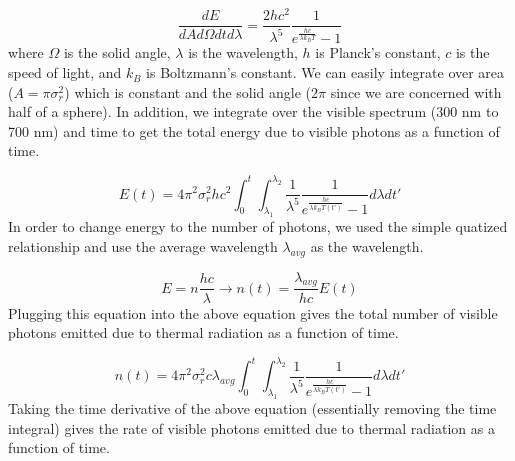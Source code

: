 \documentclass[12pt]{article}
\begin{document}
\begin{equation}
\frac{dE}{dA d \Omega dt d \lambda} = \frac{2 h c^2}{\lambda^{5}} \frac{1}{e^{\frac{hc}{\lambda k_B T}}-1}
\end{equation}
where $\Omega$ is the solid angle, $\lambda$ is the wavelength, $h$ is Planck's constant, $c$ is the speed of light, and $k_B$ is Boltzmann's constant. We can easily integrate over area ($A=\pi \sigma_r^2$) which is constant and the solid angle ($2 \pi$ since we are concerned with half of a sphere). In addition, we integrate over the visible spectrum (300 nm to 700 nm) and time to get the total energy due to visible photons as a function of time.

\begin{equation}
E(t)=4 \pi^2 \sigma_r^2 h c^2 \int_0^t \int_{\lambda_1}^{\lambda_2} \frac{1}{\lambda^{5}} \frac{1}{e^{\frac{hc}{\lambda k_B T(t')}}-1} d \lambda dt'
\end{equation}
In order to change energy to the number of photons, we used the simple quatized relationship and use the average wavelength $\lambda_{avg}$ as the wavelength.

\begin{equation}
E=n \frac{hc}{\lambda} \rightarrow n(t)=\frac{\lambda_{avg}}{hc} E(t)
\end{equation}
Plugging this equation into the above equation gives the total number of visible photons emitted due to thermal radiation as a function of time.

\begin{equation}
n(t)=4 \pi^2 \sigma_r^2 c \lambda_{avg} \int_0^t \int_{\lambda_1}^{\lambda_2} \frac{1}{\lambda^{5}} \frac{1}{e^{\frac{hc}{\lambda k_B T(t')}}-1} d \lambda dt'
\end{equation}
Taking the time derivative of the above equation (essentially removing the time integral) gives the rate of visible photons emitted due to thermal radiation as a function of time.
\end{document}
